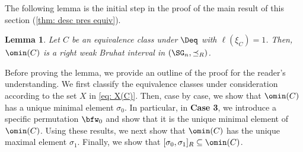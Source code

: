 \documentclass[12pt, reqno]{amsart}
\newtheorem{lemma}[theorem]{Lemma}
\theoremstyle{definition}
\numberwithin{equation}{section} \numberwithin{figure}{section}
\numberwithin{table}{section}
\begin{document}
The following lemma is the initial step in the proof of the main result of this section (\cref{thm: desc pres equiv}).


\begin{lemma}\label{lem: min C is weak Bruhat interval card 2}
Let $C$ be an equivalence class under $\Deq$ with $\ell(\xi_C) = 1$.
Then, $\omin(C)$ is a right weak Bruhat interval in $(\SG_n, \preceq_R)$.
\end{lemma}
Before proving the lemma, we provide an outline of the proof for the reader's understanding.
We first classify the equivalence classes under consideration according to the set $X$ in \cref{eq: X(C)}.
Then, case by case, we show that $\omin(C)$ has a unique minimal element $\sigma_0$.
In particular, in {\bf Case 3}, we introduce a specific permutation $\bfw_0$ and show that it is the unique minimal element of $\omin(C)$.
Using these results, we next show that $\omin(C)$ has the unique maximal element $\sigma_1$.
Finally, we show that $[\sigma_0, \sigma_1]_R \subseteq \omin(C)$.
\end{document}
